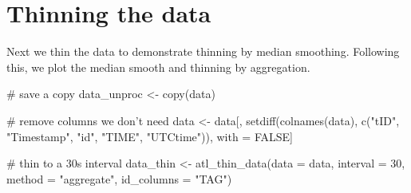 \documentclass[]{scrreprt}
\newenvironment{Shaded}{}{}
\newcommand{\CommentTok}[1]{\textcolor[rgb]{0.00,0.50,0.00}{#1}}
\newcommand{\DataTypeTok}[1]{#1}
\newcommand{\DecValTok}[1]{#1}
\newcommand{\KeywordTok}[1]{\textcolor[rgb]{0.00,0.00,1.00}{#1}}
\newcommand{\NormalTok}[1]{#1}
\newcommand{\OtherTok}[1]{\textcolor[rgb]{1.00,0.25,0.00}{#1}}
\newcommand{\StringTok}[1]{\textcolor[rgb]{0.00,0.50,0.50}{#1}}
\begin{document}
\hypertarget{thinning-the-data}{%
\section{Thinning the data}\label{thinning-the-data}}

Next we thin the data to demonstrate thinning by median smoothing.
Following this, we plot the median smooth and thinning by aggregation.

\begin{Shaded}
\begin{Highlighting}[]
\CommentTok{# save a copy}
\NormalTok{data_unproc <-}\StringTok{ }\KeywordTok{copy}\NormalTok{(data)}

\CommentTok{# remove columns we don't need}
\NormalTok{data <-}\StringTok{ }\NormalTok{data[, }\KeywordTok{setdiff}\NormalTok{(}\KeywordTok{colnames}\NormalTok{(data), }
                       \KeywordTok{c}\NormalTok{(}\StringTok{"tID"}\NormalTok{, }\StringTok{"Timestamp"}\NormalTok{, }\StringTok{"id"}\NormalTok{, }\StringTok{"TIME"}\NormalTok{, }\StringTok{"UTCtime"}\NormalTok{)), }
\NormalTok{             with =}\StringTok{ }\OtherTok{FALSE}\NormalTok{]}

\CommentTok{# thin to a 30s interval}
\NormalTok{data_thin <-}\StringTok{ }\KeywordTok{atl_thin_data}\NormalTok{(}\DataTypeTok{data =}\NormalTok{ data,}
                           \DataTypeTok{interval =} \DecValTok{30}\NormalTok{,}
                           \DataTypeTok{method =} \StringTok{"aggregate"}\NormalTok{,}
                           \DataTypeTok{id_columns =} \StringTok{"TAG"}\NormalTok{)}
\end{Highlighting}
\end{Shaded}
\end{document}
